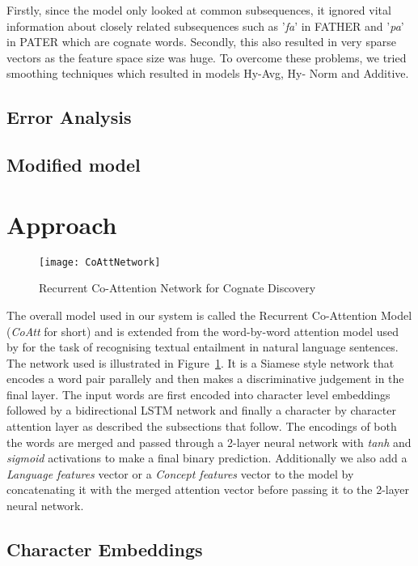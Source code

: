 \documentclass[11pt,letterpaper]{article}
\begin{document}
Firstly, since the model only looked at common subsequences, it ignored vital information about closely related subsequences such as ’\textit{fa}’ in FATHER and ’\textit{pa}’ in PATER which are cognate words. 
Secondly, this also resulted in very sparse vectors as the feature space size was huge. To overcome these problems, we tried smoothing techniques which resulted in models Hy-Avg, Hy- Norm and Additive.

\subsection{Error Analysis}
\subsection{Modified model}

\section{Approach}

\begin{figure}[t]
	\centering
	\texttt{[image: CoAttNetwork]}
    \caption{Recurrent Co-Attention Network for Cognate Discovery}
    \label{CoAttNet}
\end{figure}

The overall model used in our system is called the Recurrent Co-Attention Model (\textit{CoAtt} for short) and is extended from the word-by-word attention model used by \citet{rocktaschel2016reasoning} for the task of recognising textual entailment in natural language sentences. The network used is illustrated in Figure~\ref{CoAttNet}. It is a Siamese style network that encodes a word pair parallely and then makes a discriminative judgement in the final layer. The input words are first encoded into character level embeddings followed by a bidirectional LSTM network and finally a character by character attention layer as described the subsections that follow. The encodings of both the words are merged and passed through a 2-layer neural network with \textit{tanh} and \textit{sigmoid} activations to make a final binary prediction. Additionally we also add a \textit{Language features} vector or a \textit{Concept features} vector to the model by concatenating it with the merged attention vector before passing it to the 2-layer neural network.

\subsection{Character Embeddings}
\end{document}
